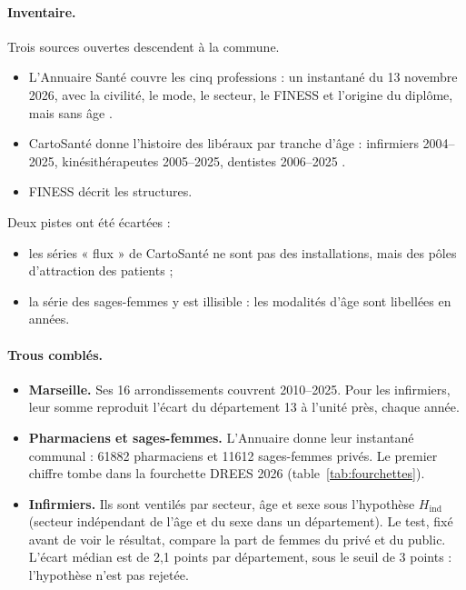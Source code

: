 \documentclass[11pt]{article}
\begin{document}
\paragraph{Inventaire.} Trois sources ouvertes descendent à la commune.
\begin{itemize}
  \item L'Annuaire Santé couvre les cinq professions : un instantané du 13 novembre 2026, avec la civilité, le mode,
  le secteur, le FINESS et l'origine du diplôme, mais sans âge \citep{ans2026annuaire}.
  \item CartoSanté donne l'histoire des libéraux par tranche d'âge : infirmiers 2004--2025, kinésithérapeutes
  2005--2025, dentistes 2006--2025 \citep{cartosante2026}.
  \item FINESS décrit les structures.
\end{itemize}
Deux pistes ont été écartées :
\begin{itemize}
  \item les séries « flux » de CartoSanté ne sont pas des installations, mais des pôles d'attraction des patients ;
  \item la série des sages-femmes y est illisible : les modalités d'âge sont libellées en années.
\end{itemize}

\paragraph{Trous comblés.}
\begin{itemize}
  \item \textbf{Marseille.} Ses 16 arrondissements couvrent 2010--2025. Pour les infirmiers, leur somme reproduit
  l'écart du département 13 à l'unité près, chaque année\mesure{}.
  \item \textbf{Pharmaciens et sages-femmes.} L'Annuaire donne leur instantané communal : \num{61882}
  pharmaciens et \num{11612} sages-femmes privés\mesure{}. Le premier chiffre tombe dans la fourchette DREES
  2026 (table~\ref{tab:fourchettes}).
  \item \textbf{Infirmiers.} Ils sont ventilés par secteur, âge et sexe sous l'hypothèse $H_{\mathrm{ind}}$
  (secteur indépendant de l'âge et du sexe dans un département). Le test, fixé avant de voir le résultat,
  compare la part de femmes du privé et du public. L'écart médian est de 2,1 points par département, sous le
  seuil de 3 points : l'hypothèse n'est pas rejetée\mesure{}.
\end{itemize}
\end{document}
